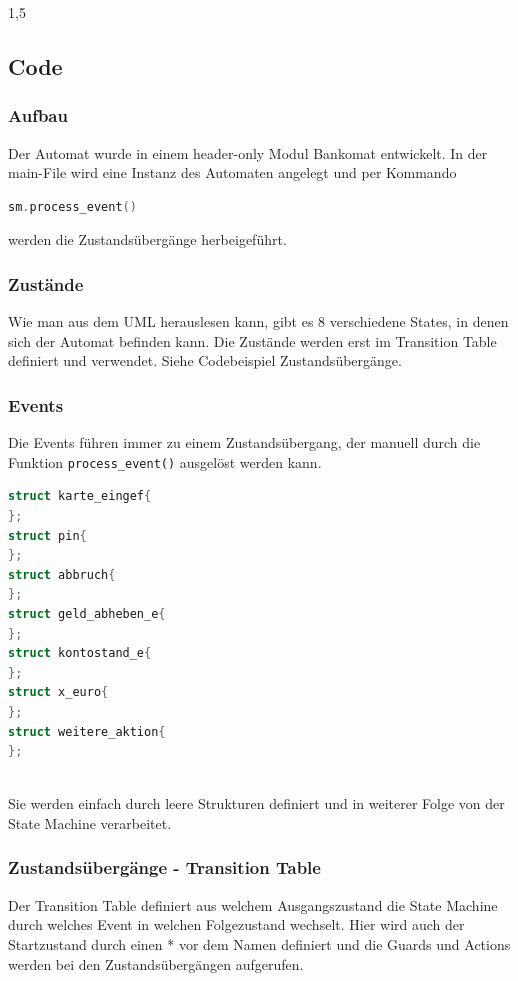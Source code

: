\documentclass[a4paper]{article}
\begin{document}
\begin{spacing}{1,5}
\subsection{Code}

\subsubsection{Aufbau}

Der Automat wurde in einem header-only Modul Bankomat entwickelt. In der main-File wird eine Instanz des Automaten angelegt und per Kommando \begin{lstlisting}[language=c++]
sm.process_event()
\end{lstlisting} werden die Zustandsübergänge herbeigeführt.

\subsubsection{Zustände}

Wie man aus dem UML herauslesen kann, gibt es 8 verschiedene States, in denen sich der Automat befinden kann. Die Zustände werden erst im Transition Table definiert und verwendet. Siehe Codebeispiel Zustandsübergänge.

\subsubsection{Events}

Die Events führen immer zu einem Zustandsübergang, der manuell durch die Funktion \texttt{process\_event()} ausgelöst werden kann.

\begin{lstlisting}[language=c++]
struct karte_eingef{
};
struct pin{
};
struct abbruch{
};
struct geld_abheben_e{
};
struct kontostand_e{
};
struct x_euro{
};
struct weitere_aktion{
};
	
\end{lstlisting}
Sie werden einfach durch leere Strukturen definiert und in weiterer Folge von der State Machine verarbeitet.


\subsubsection{Zustandsübergänge - Transition Table}

Der Transition Table definiert aus welchem Ausgangszustand die State Machine durch welches Event in welchen Folgezustand wechselt. Hier wird auch der Startzustand durch einen * vor dem Namen definiert und die Guards und Actions werden bei den Zustandsübergängen aufgerufen.


\end{spacing}
\end{document}
